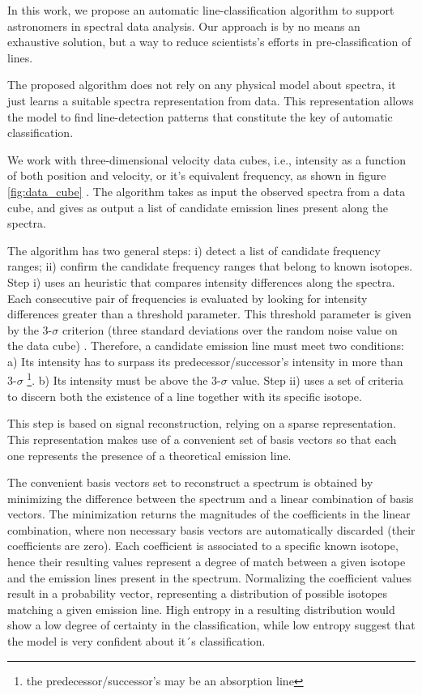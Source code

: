 In this work, we propose an automatic line-classification algorithm to support astronomers in spectral data analysis.
Our approach is by no means an exhaustive solution, but a way to reduce scientists's efforts in pre-classification of lines.

The proposed algorithm does not rely on any physical model about spectra, it just learns a suitable spectra representation from data.
This representation allows the model to find line-detection patterns that constitute the key of automatic classification.

We work with three-dimensional velocity data cubes, i.e., intensity as a function of both position and velocity, or it's equivalent frequency, as shown in figure \ref{fig:data_cube} \citep{eguchi_superluminal_2013}. 
The algorithm takes as input the observed spectra from a data cube, and gives as output a list of candidate emission lines present along the spectra.

The algorithm has two general steps: 
i) detect a list of candidate frequency ranges; 
ii) confirm the candidate frequency ranges that belong to known isotopes. 
Step i) uses an heuristic that compares intensity differences along the spectra.
Each consecutive pair of frequencies is evaluated by looking for intensity differences greater than a threshold parameter.
This threshold parameter is given by the 3-$\sigma$ criterion (three standard deviations over the random noise value on the data cube) \citep{sharpee_introducing_2003}.
Therefore, a candidate emission line must meet two conditions:
a) Its intensity has to surpass its predecessor/successor's intensity in more than 3-$\sigma$ \footnote{the predecessor/successor's may be an absorption line}.
b) Its intensity must be above the 3-$\sigma$ value.
Step ii) uses a set of criteria to discern both the existence of a line together with its specific isotope. 

This step is based on signal reconstruction, relying on a sparse representation. This representation makes use of a convenient set of basis vectors so that each one represents the presence of a theoretical emission line.

The convenient basis vectors set to reconstruct a spectrum is obtained by minimizing the difference between the spectrum and a linear combination of basis vectors. The minimization returns the magnitudes of the coefficients in the linear combination, where non necessary basis vectors are automatically discarded (their coefficients are zero).
Each coefficient is associated to a specific known isotope, hence their resulting values represent a degree of match between a given isotope and the emission lines present in the spectrum.
Normalizing the coefficient values result in a probability vector, representing a distribution of possible isotopes matching a given emission line.
High entropy in a resulting distribution would show a low degree of certainty in the classification, while low entropy suggest that the model is very confident about it´s classification.

